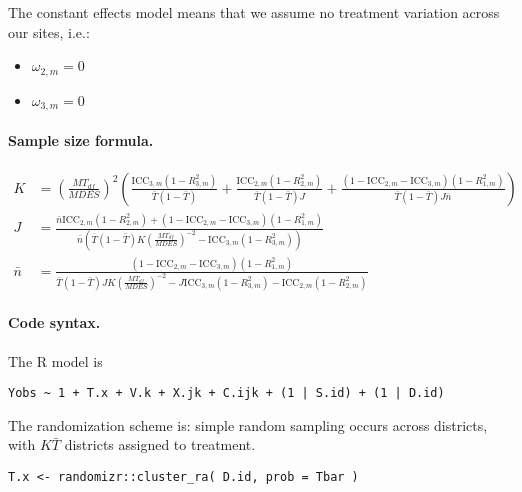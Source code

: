 \documentclass[12pt]{article}
\begin{document}
The constant effects model means that we assume no treatment variation across our sites, i.e.:
\begin{itemize}
\item $\omega_{2,m} = 0$
\item $\omega_{3,m} = 0$
\end{itemize}



\paragraph{Sample size formula.} 
\begin{align}
K &= \left(\frac{MT_{df}}{MDES}\right)^2 \left( \frac{\text{ICC}_{3,m}(1-R_{3,m}^2)}{\bar{T}(1 - \bar{T})}  + \frac{\text{ICC}_{2,m} (1-R_{2,m}^2)}{\bar{T}(1 - \bar{T}) J} + \frac{(1-\text{ICC}_{2,m}-\text{ICC}_{3,m})(1-R^2_{1,m})}{\bar{T}(1 - \bar{T}) J \bar{n}} \right)\\
J&=   \frac{\bar{n}\text{ICC}_{2,m} (1-R_{2,m}^2) + (1-\text{ICC}_{2,m}-\text{ICC}_{3,m})(1-R^2_{1,m})}{\bar{n}\left(\bar{T}(1 - \bar{T}) K \left(\frac{MT_{df}}{MDES}\right)^{-2} - \text{ICC}_{3,m}(1-R_{3,m}^2)\right)} \\
\bar{n} &= \frac{(1-\text{ICC}_{2,m}-\text{ICC}_{3,m})(1-R^2_{1,m})}{\bar{T}(1 - \bar{T})JK \left(\frac{MT_{df}}{MDES}\right)^{-2} - J\text{ICC}_{3,m}(1-R_{3,m}^2) - \text{ICC}_{2,m} (1-R_{2,m}^2)}
\end{align}

\paragraph{Code syntax.}
The R model is
\begin{verbatim}
Yobs ~ 1 + T.x + V.k + X.jk + C.ijk + (1 | S.id) + (1 | D.id)
\end{verbatim}

The randomization scheme is: simple random sampling occurs across districts, with $K\bar{T}$ districts assigned to treatment.
\begin{verbatim}
T.x <- randomizr::cluster_ra( D.id, prob = Tbar )
\end{verbatim}



\newpage 
\end{document}
